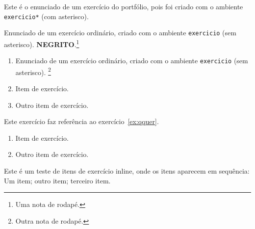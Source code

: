\documentclass[a4paper]{article}
\begin{document}
\maketitle

\begin{exercicio*}
  Este é o enunciado de um exercício do portfólio, pois foi criado com o ambiente \texttt{exercicio*} (com asterisco).
\end{exercicio*}

\begin{exercicio}
  \label{ex:qquer}
  Enunciado de um exercício ordinário, criado com o ambiente \texttt{exercicio} (sem asterisco).
  \textbf{\MakeUppercase{Negrito}}.\footnote{Uma nota de rodapé.}
\end{exercicio}

\begin{exercicio}
  \begin{enumerate}
  \item Enunciado de um exercício ordinário, criado com o ambiente \texttt{exercicio} (sem asterisco).
  \footnote{Outra nota de rodapé.}
  \item Item de exercício.
  \item Outro item de exercício.
  \end{enumerate}
\end{exercicio}

\begin{exercicio}
  Este exercício faz referência ao exercício~\ref{ex:qquer}.
\end{exercicio}

\begin{exercicio}
  \begin{enumerate}
  \item Item de exercício.
  \item Outro item de exercício.
  \end{enumerate}
  
  \begin{inlineenum}
    Este é um teste de itens de exercício inline, onde os itens aparecem em sequência:
    \inlineitem Um item;
    \inlineitem outro item;
    \inlineitem terceiro item.
  \end{inlineenum}

\end{exercicio}
\end{document}
